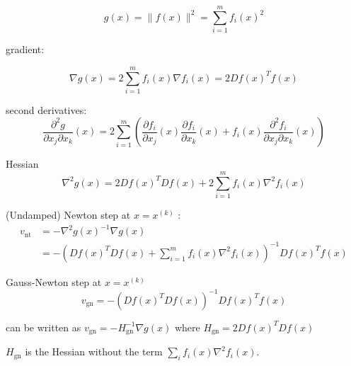 \begin{equation}
g(x)=\|f(x)\|^{2}=\sum_{i=1}^{m} f_{i}(x)^{2}
\end{equation}

\begin{theorem}
   gradient:

\begin{equation}
\nabla g(x)=2 \sum_{i=1}^{m} f_{i}(x) \nabla f_{i}(x)=2 D f(x)^{T} f(x)
\end{equation} 
\end{theorem}

\begin{theorem}
    second derivatives:
\begin{equation}
\frac{\partial^{2} g}{\partial x_{j} \partial x_{k}}(x)=2 \sum_{i=1}^{m}\left(\frac{\partial f_{i}}{\partial x_{j}}(x) \frac{\partial f_{i}}{\partial x_{k}}(x)+f_{i}(x) \frac{\partial^{2} f_{i}}{\partial x_{j} \partial x_{k}}(x)\right)
\end{equation}
\end{theorem}

\begin{theorem}
    Hessian
\begin{equation}
\nabla^{2} g(x)=2 D f(x)^{T} D f(x)+2 \sum_{i=1}^{m} f_{i}(x) \nabla^{2} f_{i}(x)
\end{equation}
\end{theorem}

\begin{theorem}
    (Undamped) Newton step at $ x=x^{(k)} $ :
\begin{equation}
\begin{aligned}
v_{\mathrm{nt}} &=-\nabla^{2} g(x)^{-1} \nabla g(x) \\
&=-\left(D f(x)^{T} D f(x)+\sum_{i=1}^{m} f_{i}(x) \nabla^{2} f_{i}(x)\right)^{-1} D f(x)^{T} f(x)
\end{aligned}
\end{equation}

\end{theorem}

\begin{theorem}
    Gauss-Newton step at $ x=x^{(k)} $
\begin{equation}
v_{\mathrm{gn}}=-\left(D f(x)^{T} D f(x)\right)^{-1} D f(x)^{T} f(x)
\end{equation}
\end{theorem}

\begin{corollary}
    can be written as $ v_{\mathrm{gn}}=-H_{\mathrm{gn}}^{-1} \nabla g(x) $ where $ H_{\mathrm{gn}}=2 D f(x)^{T} D f(x) $

    $ H_{\mathrm{gn}} $ is the Hessian without the term $ \sum_{i} f_{i}(x) \nabla^{2} f_{i}(x) $.
\end{corollary}





